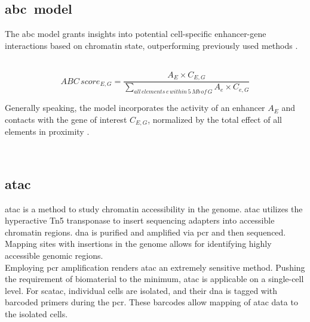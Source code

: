    \subsection{\acs{abc} model}
    The \acf{abc} model grants insights into potential cell-specific enhancer-gene interactions based on chromatin state, outperforming previously used methods \cite{fulcoActivitybycontactModelEnhancer2019a, nasserGenomewideEnhancerMaps2021a}.

        $$ ABC\,score_{E, G} = \frac{A_E \times C_{E,G}}{\sum\limits_{all\,elements\,e\,within\,5\,Mb\,of\,G} A_e \times C_{e, G}} $$

    Generally speaking, the model incorporates the activity of an enhancer $A_E$ and contacts with the gene of interest $C_{E,G}$, normalized by the total effect of all elements in proximity \cite{fulcoActivitybycontactModelEnhancer2019a, nasserGenomewideEnhancerMaps2021a}.

    \subsection{\acs{atac}}
    \Acf{atac} is a method to study chromatin accessibility in the genome. \Ac{atac} utilizes the hyperactive Tn5 transponase to insert sequencing adapters into accessible chromatin regions. \ac{dna} is purified and amplified via \ac{pcr} and then sequenced. Mapping sites with insertions in the genome allows for identifying highly accessible genomic regions. \cite{buenrostroTranspositionNativeChromatin2013, buenrostroATACseqMethodAssaying2015}\\
    Employing \ac{pcr} amplification renders \ac{atac} an extremely sensitive method. Pushing the requirement of biomaterial to the minimum, \ac{atac} is applicable on a single-cell level. For sc\ac{atac}, individual cells are isolated, and their \ac{dna} is tagged with barcoded primers during the \ac{pcr}. These barcodes allow mapping of \ac{atac} data to the isolated cells. \cite{buenrostroSinglecellChromatinAccessibility2015}

